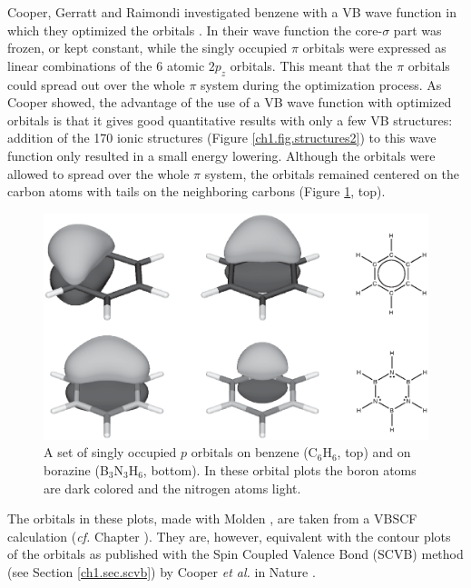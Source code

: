 Cooper, Gerratt and Raimondi investigated benzene with a VB wave function in which they optimized the orbitals \cite{nature}. In their wave function the core-$\sigma$ part was frozen, or kept constant, while the singly occupied $\pi$ orbitals were expressed as linear combinations of the 6 atomic $2p_z$ orbitals. This meant that the $\pi$ orbitals could spread out over the whole $\pi$ system during the optimization process. As Cooper showed, the advantage of the use of a VB wave function with optimized orbitals is that it gives good quantitative results with only a few VB structures: addition of the 170 ionic structures (Figure \ref{ch1.fig.structures2}) to this wave function only resulted in a small energy lowering. Although the orbitals were allowed to spread over the whole $\pi$ system, the orbitals remained centered on the carbon atoms with tails on the neighboring carbons (Figure \ref{ch1.fig6}, top). 
\begin{figure}[htbp]
\center
\includegraphics[scale=0.5]{introduction/figures/figure6.eps}
\caption{A set of singly occupied $p$ orbitals on benzene (C$_6$H$_6$, top) and on borazine (B$_3$N$_3$H$_6$, bottom). In these orbital plots the boron atoms are dark colored and the nitrogen atoms light.}
\label{ch1.fig6}
\end{figure}
The orbitals in these plots, made with Molden \cite{molden}, are taken from a VBSCF calculation (\textit{cf.} Chapter \chinorganic). They are, however, equivalent with the contour plots of the orbitals as published with the Spin Coupled Valence Bond (SCVB) method (see Section \ref{ch1.sec.scvb}) by Cooper \textit{et al.} in Nature \cite{nature}.


